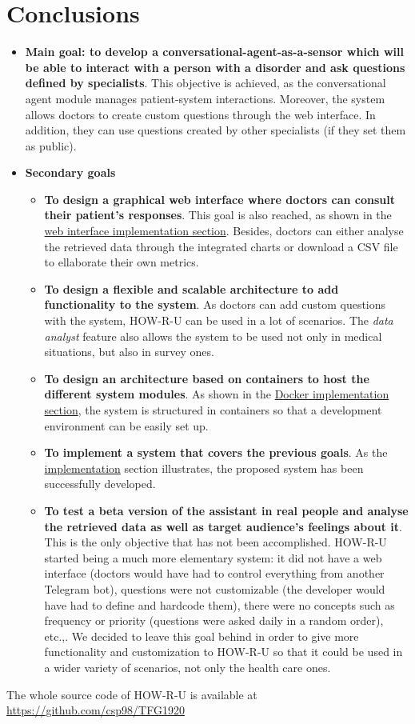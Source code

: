 \documentclass[12pt,english]{article}
\begin{document}
\section{Conclusions}

\begin{itemize}
  \item \textbf{Main goal: to develop a conversational-agent-as-a-sensor which will be able to interact with a person with a disorder and ask questions defined by specialists}. This objective is achieved, as the conversational agent module manages patient-system interactions. Moreover, the system allows doctors to create custom questions through the web interface. In addition, they can use questions created by other specialists (if they set them as public).
  \item \textbf{Secondary goals}
  \begin{itemize}
    \item \textbf{To design a graphical web interface where doctors can consult their patient’s responses}. This goal is also reached, as shown in the \hyperref[sec:web_int]{web interface implementation section}. Besides, doctors can either analyse the retrieved data through the integrated charts or download a CSV file to ellaborate their own metrics.
    \item \textbf{To design a flexible and scalable architecture to add functionality to the system}. As doctors can add custom questions with the system, HOW-R-U can be used in a lot of scenarios. The \emph{data analyst} feature also allows the system to be used not only in medical situations, but also in survey ones.
    \item \textbf{To design an architecture based on containers to host the different system modules}. As shown in the \hyperref[sec:docker]{Docker implementation section}, the system is structured in containers so that a development environment can be easily set up.
    \item \textbf{To implement a system that covers the previous goals}. As the \hyperref[sec:implementation]{implementation} section illustrates, the proposed system has been successfully developed.
    \item \textbf{To test a beta version of the assistant in real people and analyse the retrieved data as well as target audience’s feelings about it}. This is the only objective that has not been accomplished. HOW-R-U started being a much more elementary system: it did not have a web interface (doctors would have had to control everything from another Telegram bot), questions were not customizable (the developer would have had to define and hardcode them), there were no concepts such as frequency or priority (questions were asked daily in a random order), etc.,.
    We decided to leave this goal behind in order to give more functionality and customization to HOW-R-U so that it could be used in a wider variety of scenarios, not only the health care ones.
  \end{itemize}
\end{itemize}



The whole source code of HOW-R-U is available at \href{https://github.com/csp98/TFG1920}{https://github.com/csp98/TFG1920}

\newpage


\doclicenseThis
\end{document}
